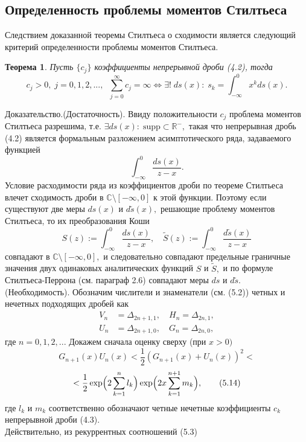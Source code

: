 \documentclass[12 pt, a4 paper]{article}
\theoremstyle{plain}   \newtheorem{Pro}{Задача}
\newtheorem{The}{Теорема}
\begin{document}
\subsection{Определенность проблемы моментов Стилтьеса}
Следствием доказанной теоремы Стилтьеса о сходимости
является следующий критерий определенности
проблемы моментов Стилтьеса.
\begin{The}
Пусть
$ \{ c_j \} $
коэффициенты непрерывной дроби (4.2), тогда
$$
  c_j >0, \; j=0,1,2,..., \; \;
    \sum _{j=0}^{\infty}c_j =\infty
	  \Longleftrightarrow
	    \exists ! \; ds(x) : \;
		  s_k = \int _{-\infty}^0 x^k ds(x) .
$$
\end{The}
{\Large Доказательство.(Достаточность).}
Ввиду положительности
$ c_j $
проблема моментов Стилтьеса разрешима, т.е.
$ \exists ds(x): \; \mathrm{supp} \subset \mathbb{R}^- , $
такая что непрерывная дробь (4.2) является формальным
разложением асимптотического ряда, задаваемого функцией
$$
  \int _{-\infty}^0 \frac{ds(x)}{z-x} .
$$
Условие расходимости ряда из коэффициентов дроби
по теореме Стилтьеса влечет сходимость дроби в
$ \mathbb{C} \setminus [-\infty ,0] $
к этой функции. Поэтому если существуют две меры
$ ds(x) $ и $ d \tilde s(x) , $
решающие проблему моментов Стилтьеса, то их
преобразования Коши
$$
  S(z):=\int _{-\infty}^0 \frac{ds(x)}{z-x}, \quad
    \tilde S(z):=\int _{-\infty}^0 \frac
	{d\tilde s(x)}{z-x}
$$
совпадают в
$ \mathbb{C} \setminus [-\infty , 0] , $
и следовательно совпадают предельные граничные значения
двух одинаковых аналитических функций
$ S $ и $ \tilde S , $
и по формуле Стилтьеса-Перрона (см. параграф 2.6)
совпадают меры
$ ds $ и $ d\tilde s .$ \\
{\Large (Необходимость).}
Обозначим числители и знаменатели (см. (5.2)) четных и
нечетных подходящих дробей как	
\begin{align*}
  V_n & = \Delta _{2n+1,1}, \quad
    H_n  = \Delta _{2n,1} , \\
  U_n & = \Delta _{2n+1,0} , \quad
    G_n  = \Delta _{2n,0} ,
\end{align*}
где
$ n=0,1,2,... $
Докажем сначала оценку сверху (при
$ x>0) $
$$
  G_{n+1}(x)U_n (x) < \frac{1}{2}
    (G_{n+1}(x)+U_n (x))^2 <
$$
$$
	 <\frac{1}{2}
	  \exp \Bigl (2 \sum _{k=1}^n l_k \Bigr )
	  \exp \Bigl (2x \sum _{k=1}^{n+1} m_k \Bigr ) ,
	    \qquad (5.14)
$$
где
$ l_k $ и $ m_k $
соответственно обозначают четные  нечетные коэффициенты
$ c_k $
непрерывной дроби (4.3).\\
Действительно, из рекуррентных соотношений (5.3)
\end{document}
